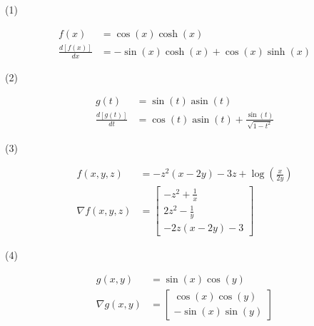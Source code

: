 \documentclass{article}
\begin{document}
(1)

\begin{align*}
	f{\left(x \right)} &= \cos{\left(x \right)} \cosh{\left(x \right)}\\
	\frac{d \left[ f(x) \right ] }{dx} &= - \sin{\left(x \right)} \cosh{\left(x \right)} + \cos{\left(x \right)} \sinh{\left(x \right)}
\end{align*}

(2)

\begin{align*}
	g{\left(t \right)} &= \sin{\left(t \right)} \operatorname{asin}{\left(t \right)}\\
	\frac{d \left[ g(t) \right ] }{dt} &= \cos{\left(t \right)} \operatorname{asin}{\left(t \right)} + \frac{\sin{\left(t \right)}}{\sqrt{1 - t^{2}}}
\end{align*}

(3)

\begin{align*}
	f{\left(x,y,z \right)} &= - z^{2} \left(x - 2 y\right) - 3 z + \log{\left(\frac{x}{2 y} \right)}\\
	\nabla f{\left(x,y,z \right)} &= \left[\begin{matrix}- z^{2} + \frac{1}{x}\\2 z^{2} - \frac{1}{y}\\- 2 z \left(x - 2 y\right) - 3\end{matrix}\right]
\end{align*}

(4)

\begin{align*}
	g{\left(x,y \right)} &= \sin{\left(x \right)} \cos{\left(y \right)}\\
	\nabla g{\left(x,y \right)} &= \left[\begin{matrix}\cos{\left(x \right)} \cos{\left(y \right)}\\- \sin{\left(x \right)} \sin{\left(y \right)}\end{matrix}\right]
\end{align*}
\end{document}
